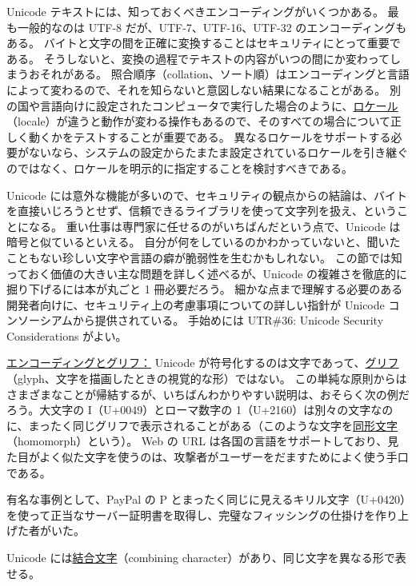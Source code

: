 \documentclass[uplatex]{jsarticle}
\def\label#1{}%
\begin{document}
Unicode テキストには、知っておくべきエンコーディングがいくつかある。
最も一般的なのは UTF-8 だが、UTF-7、UTF-16、UTF-32 のエンコーディングもある。
バイトと文字の間を正確に変換することはセキュリティにとって重要である。
そうしないと、変換の過程でテキストの内容がいつの間にか変わってしまうおそれがある。
照合順序（collation、ソート順）はエンコーディングと言語によって変わるので、それを知らないと意図しない結果になることがある。
別の国や言語向けに設定されたコンピュータで実行した場合のように、\underline{ロケール}（locale）が違うと動作が変わる操作もあるので、そのすべての場合について正しく動くかをテストすることが重要である。
異なるロケールをサポートする必要がないなら、システムの設定からたまたま設定されているロケールを引き継ぐのではなく、ロケールを明示的に指定することを検討すべきである。

Unicode には意外な機能が多いので、セキュリティの観点からの結論は、バイトを直接いじろうとせず、信頼できるライブラリを使って文字列を扱え、ということになる。
重い仕事は専門家に任せるのがいちばんだという点で、Unicode は暗号と似ているといえる。
自分が何をしているのかわかっていないと、聞いたこともない珍しい文字や言語の癖が脆弱性を生むかもしれない。
この節では知っておく価値の大きい主な問題を詳しく述べるが、Unicode の複雑さを徹底的に掘り下げるには本が丸ごと 1 冊必要だろう。
細かな点まで理解する必要のある開発者向けに、セキュリティ上の考慮事項についての詳しい指針が Unicode コンソーシアムから提供されている。
手始めには UTR\#36: Unicode Security Considerations がよい。

\underline{エンコーディングとグリフ：}
Unicode が符号化するのは文字であって、\underline{グリフ}（glyph、文字を描画したときの視覚的な形）ではない。
この単純な原則からはさまざまなことが帰結するが、いちばんわかりやすい説明は、おそらく次の例だろう。大文字の I（U+0049）とローマ数字の 1（U+2160）は別々の文字なのに、まったく同じグリフで表示されることがある（このような文字を\underline{同形文字}（homomorph）という）。
Web の URL は各国の言語をサポートしており、見た目がよく似た文字を使うのは、攻撃者がユーザーをだますためによく使う手口である。

\begin{exa}\label{exa:ch10-paypal-homomorph}
有名な事例として、PayPal の P とまったく同じに見えるキリル文字（U+0420）を使って正当なサーバー証明書を取得し、完璧なフィッシングの仕掛けを作り上げた者がいた。
\end{exa}

Unicode には\underline{結合文字}（combining character）があり、同じ文字を異なる形で表せる。
\end{document}
